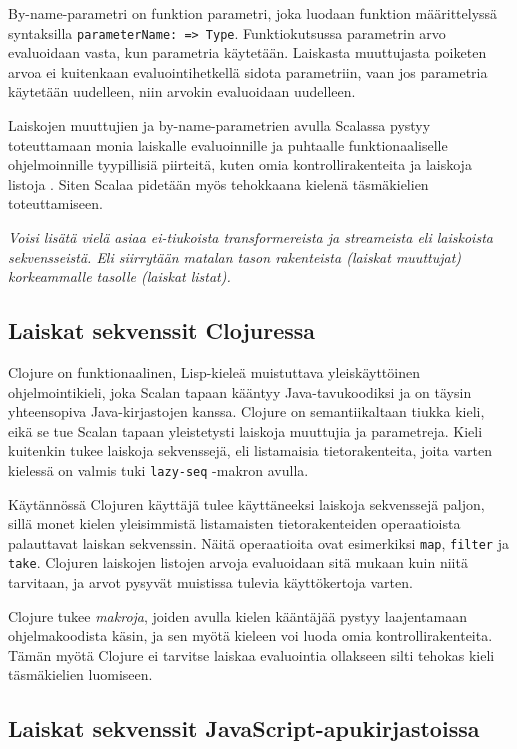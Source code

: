 By-name-parametri on funktion parametri, joka luodaan funktion määrittelyssä syntaksilla \verb!parameterName: => Type!. Funktiokutsussa parametrin arvo evaluoidaan vasta, kun parametria käytetään. Laiskasta muuttujasta poiketen arvoa ei kuitenkaan evaluointihetkellä sidota parametriin, vaan jos parametria käytetään uudelleen, niin arvokin evaluoidaan uudelleen.

Laiskojen muuttujien ja by-name-parametrien avulla Scalassa pystyy toteuttamaan monia laiskalle evaluoinnille ja puhtaalle funktionaaliselle ohjelmoinnille tyypillisiä piirteitä, kuten omia kontrollirakenteita ja laiskoja listoja \citet{chiusano2014functional}. Siten Scalaa pidetään myös tehokkaana kielenä täsmäkielien toteuttamiseen.

\textit{Voisi lisätä vielä asiaa ei-tiukoista transformereista ja streameista eli laiskoista sekvensseistä. Eli siirrytään matalan tason rakenteista (laiskat muuttujat) korkeammalle tasolle (laiskat listat).}

\subsection{Laiskat sekvenssit Clojuressa}

Clojure on funktionaalinen, Lisp-kieleä muistuttava yleiskäyttöinen ohjelmointikieli, joka Scalan tapaan kääntyy Java-tavukoodiksi ja on täysin yhteensopiva Java-kirjastojen kanssa. Clojure on semantiikaltaan tiukka kieli, eikä se tue Scalan tapaan yleistetysti laiskoja muuttujia ja parametreja. Kieli kuitenkin tukee laiskoja sekvenssejä, eli listamaisia tietorakenteita, joita varten kielessä on valmis tuki \verb!lazy-seq! -makron avulla.

Käytännössä Clojuren käyttäjä tulee käyttäneeksi laiskoja sekvenssejä paljon, sillä monet kielen yleisimmistä listamaisten tietorakenteiden operaatioista palauttavat laiskan sekvenssin. Näitä operaatioita ovat esimerkiksi \verb!map!, \verb!filter! ja \verb!take!. Clojuren laiskojen listojen arvoja evaluoidaan sitä mukaan kuin niitä tarvitaan, ja arvot pysyvät muistissa tulevia käyttökertoja varten.

Clojure tukee \textit{makroja}, joiden avulla kielen kääntäjää pystyy laajentamaan ohjelmakoodista käsin, ja sen myötä kieleen voi luoda omia kontrollirakenteita. Tämän myötä Clojure ei tarvitse laiskaa evaluointia ollakseen silti tehokas kieli täsmäkielien luomiseen.

\subsection{Laiskat sekvenssit JavaScript-apukirjastoissa}

